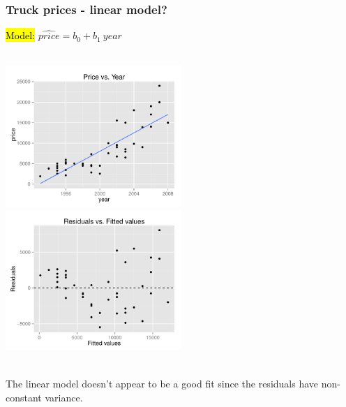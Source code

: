 \documentclass[slidestop,compress,mathserif,12pt,t,professionalfonts,xcolor=table]{beamer}
\begin{document}

\begin{frame}
\frametitle{Truck prices - linear model?}

\hl{Model:}  $\widehat{price} = b_0 + b_1~year$

$\:$ \\

\includegraphics[width=0.5\textwidth]{figures/pickup/pu_price_year_scat} 
\includegraphics[width=0.5\textwidth]{figures/pickup/pu_price_year_res}

\pause

$\:$ \\

The linear model doesn't appear to be a good fit since the residuals have non-constant variance.


\end{frame}

\end{document}
